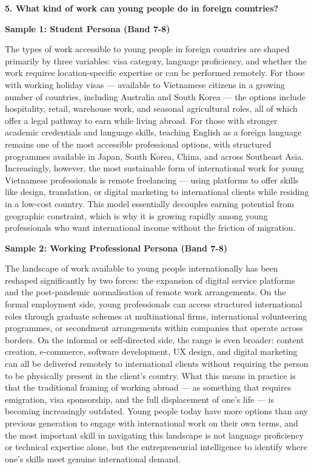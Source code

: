 \separator

\begin{ieltsquestion}
\textbf{5. What kind of work can young people do in foreign countries?}
\end{ieltsquestion}
\textbf{Sample 1: Student Persona (Band 7-8)}

The types of work accessible to young people in foreign countries are shaped primarily by three variables: visa category, language proficiency, and whether the work requires location-specific expertise or can be performed remotely. For those with working holiday visas — available to Vietnamese citizens in a growing number of countries, including Australia and South Korea — the options include hospitality, retail, warehouse work, and seasonal agricultural roles, all of which offer a legal pathway to earn while living abroad. For those with stronger academic credentials and language skills, teaching English as a foreign language remains one of the most accessible professional options, with structured programmes available in Japan, South Korea, China, and across Southeast Asia. Increasingly, however, the most sustainable form of international work for young Vietnamese professionals is remote freelancing — using platforms to offer skills like design, translation, or digital marketing to international clients while residing in a low-cost country. This model essentially decouples earning potential from geographic constraint, which is why it is growing rapidly among young professionals who want international income without the friction of migration.

\textbf{Sample 2: Working Professional Persona (Band 7-8)}

The landscape of work available to young people internationally has been reshaped significantly by two forces: the expansion of digital service platforms and the post-pandemic normalisation of remote work arrangements. On the formal employment side, young professionals can access structured international roles through graduate schemes at multinational firms, international volunteering programmes, or secondment arrangements within companies that operate across borders. On the informal or self-directed side, the range is even broader: content creation, e-commerce, software development, UX design, and digital marketing can all be delivered remotely to international clients without requiring the person to be physically present in the client's country. What this means in practice is that the traditional framing of working abroad — as something that requires emigration, visa sponsorship, and the full displacement of one's life — is becoming increasingly outdated. Young people today have more options than any previous generation to engage with international work on their own terms, and the most important skill in navigating this landscape is not language proficiency or technical expertise alone, but the entrepreneurial intelligence to identify where one's skills meet genuine international demand.

